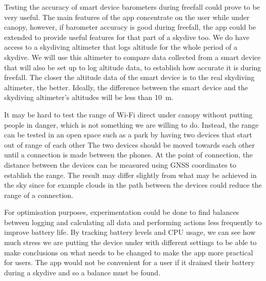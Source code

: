 \documentclass[11pt, a4paper, twocolumn]{article}
\begin{document}
Testing the accuracy of smart device barometers during freefall could prove to be very useful. The main features of the app concentrate on the user while under canopy, however, if barometer accuracy is good during freefall, the app could be extended to provide useful features for that part of a skydive too. We do have access to a skydiving altimeter that logs altitude for the whole period of a skydive. We will use this altimeter to compare data collected from a smart device that will also be set up to log altitude data, to establish how accurate it is during freefall. The closer the altitude data of the smart device is to the real skydiving altimeter, the better. Ideally, the difference between the smart device and the skydiving altimeter's altitudes will be less than \SI{10}{\metre}.

It may be hard to test the range of Wi-Fi direct under canopy without putting people in danger, which is not something we are willing to do. Instead, the range can be tested in an open space such as a park by having two devices that start out of range of each other The two devices should be moved towards each other until a connection is made between the phones. At the point of connection, the distance between the devices can be measured using GNSS coordinates to establish the range. The result may differ slightly from what may be achieved in the sky since for example clouds in the path between the devices could reduce the range of a connection.

For optimisation purposes, experimentation could be done to find balances between logging and calculating all data and performing actions less frequently to improve battery life. By tracking battery levels and CPU usage, we can see how much stress we are putting the device under with different settings to be able to make conclusions on what needs to be changed to make the app more practical for users. The app would not be convenient for a user if it drained their battery during a skydive and so a balance must be found.
\end{document}
